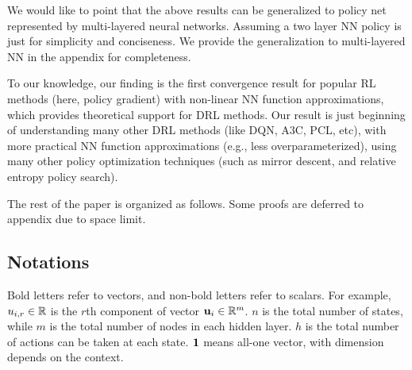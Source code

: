 We would like to point that the above results can be generalized to policy net represented by multi-layered neural networks. Assuming a two layer NN policy is just for simplicity and conciseness. We provide the generalization to multi-layered NN in the appendix for completeness.

To our knowledge, our finding is the first convergence result for popular RL methods (here, policy gradient) with non-linear NN function approximations, which provides theoretical support for DRL methods. Our result is just beginning of understanding many other DRL methods (like DQN, A3C, PCL, etc), with more practical NN function approximations (e.g., less overparameterized), using many other policy optimization techniques (such as mirror descent, and relative entropy policy search).

The rest of the paper is organized as follows. Some proofs are deferred to appendix due to space limit.

\subsection{Notations}

Bold letters refer to vectors, and non-bold letters refer to scalars. For example, $u_{i,r} \in {\mathbb{R}}$ is the $r$th component of vector ${\mathbf{u}}_i \in {\mathbb{R}}^m$. $n$ is the total number of states, while $m$ is the total number of nodes in each hidden layer. $h$ is the total number of actions can be taken at each state. ${\mathbf{1}}$ means all-one vector, with dimension depends on the context.

